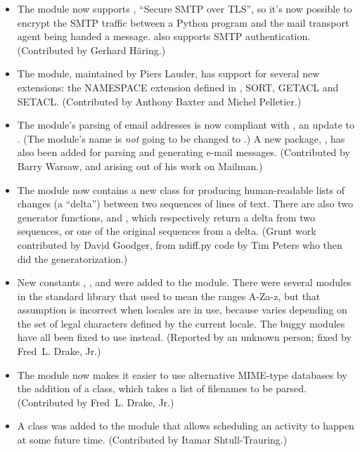 \documentclass{howto}
\begin{document}
\begin{itemize}
  \item The  module now supports , ``Secure
  SMTP over TLS'', so it's now possible to encrypt the SMTP traffic
  between a Python program and the mail transport agent being handed a
  message.   also supports SMTP authentication. 
  (Contributed by Gerhard H\"aring.)

  \item The  module, maintained by Piers Lauder, has
  support for several new extensions: the NAMESPACE extension defined
  in , SORT, GETACL and SETACL.  (Contributed by Anthony
  Baxter and Michel Pelletier.)

  \item The  module's parsing of email addresses is now
  compliant with , an update to .  (The module's
  name is \emph{not} going to be changed to .)  A new
  package, , has also been added for parsing and
  generating e-mail messages.  (Contributed by Barry Warsaw, and
  arising out of his work on Mailman.)

  \item The  module now contains a new 
  class for producing human-readable lists of changes (a ``delta'')
  between two sequences of lines of text.  There are also two
  generator functions,  and ,
  which respectively return a delta from two sequences, or one of the
  original sequences from a delta. (Grunt work contributed by David
  Goodger, from ndiff.py code by Tim Peters who then did the
  generatorization.)

  \item New constants ,
  , and  were
  added to the  module.  There were several modules in
  the standard library that used  to mean the
  ranges A-Za-z, but that assumption is incorrect when locales are in
  use, because  varies depending on the set
  of legal characters defined by the current locale.  The buggy
  modules have all been fixed to use  instead.
  (Reported by an unknown person; fixed by Fred~L. Drake, Jr.)

  \item The  module now makes it easier to use
  alternative MIME-type databases by the addition of a
   class, which takes a list of filenames to be
  parsed.  (Contributed by Fred~L. Drake, Jr.)

  \item A  class was added to the 
  module that allows scheduling an activity to happen at some future
  time.  (Contributed by Itamar Shtull-Trauring.)

\end{itemize}
\end{document}
